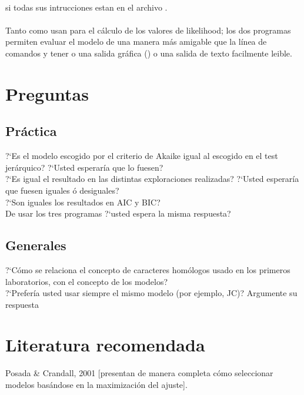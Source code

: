 \\
\noindent
si todas sus intrucciones estan en el archivo .\\
\\
Tanto  como  usan  para el c\'alculo de los valores de likelihood; los dos programas permiten evaluar el modelo de una manera m\'as amigable que la l\'inea de comandos y tener o una salida gr\'afica () o una salida de texto facilmente leible.

\section{Preguntas}
\subsection{Pr\'actica}
\noindent
?`Es el modelo escogido por el criterio de Akaike igual al escogido en el test jer\'arquico? ?`Usted esperar\'ia que lo fuesen?\\
?`Es igual el resultado en las distintas exploraciones realizadas? ?`Usted esperar\'ia que fuesen iguales \'o desiguales?\\ 
?`Son iguales los resultados en AIC y BIC?\\
De usar los tres programas ?`usted espera la misma respuesta?
\subsection{Generales}
\noindent
?`C\'omo se relaciona el concepto de caracteres hom\'ologos usado en los primeros laboratorios, con el concepto de los modelos?\\
?`Prefer\'ia usted usar siempre el mismo modelo (por ejemplo, JC)? Argumente su respuesta

\section{Literatura recomendada}
\noindent
Posada \& Crandall, 2001 [presentan de manera completa c\'omo seleccionar modelos bas\'andose en la maximizaci\'on del ajuste].
